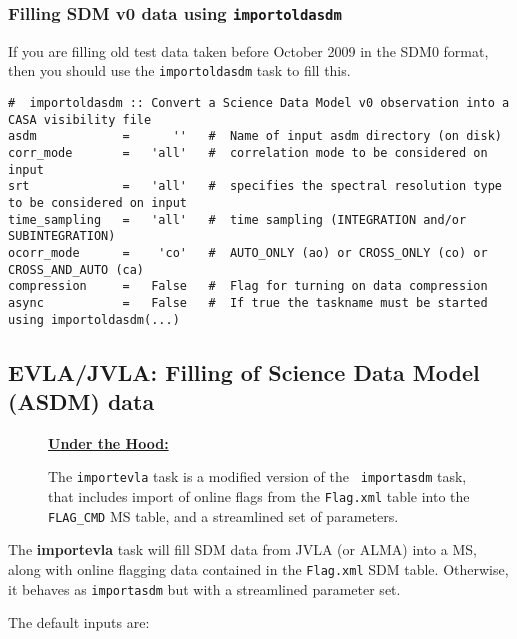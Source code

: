 \subsubsection{Filling SDM v0 data using {\tt importoldasdm}}
\label{section:io.import.asdm.old}

If you are filling old test data taken
before October 2009 in the SDM0 format, then you should use the 
{\tt importoldasdm} task to fill this.
\small
\begin{verbatim}
#  importoldasdm :: Convert a Science Data Model v0 observation into a CASA visibility file
asdm            =      ''   #  Name of input asdm directory (on disk)
corr_mode       =   'all'   #  correlation mode to be considered on input
srt             =   'all'   #  specifies the spectral resolution type to be considered on input
time_sampling   =   'all'   #  time sampling (INTEGRATION and/or SUBINTEGRATION)
ocorr_mode      =    'co'   #  AUTO_ONLY (ao) or CROSS_ONLY (co) or CROSS_AND_AUTO (ca)
compression     =   False   #  Flag for turning on data compression
async           =   False   #  If true the taskname must be started using importoldasdm(...)
\end{verbatim}
\normalsize

\subsection{EVLA/JVLA: Filling of Science Data Model (ASDM) data}
\label{section:io.import.evla}

\begin{wrapfigure}{r}{2.5in}
  \begin{boxedminipage}{2.5in}
     \centerline{\underline{\bf Under the Hood:}}
     The {\tt importevla} task is a modified version of the {\tt
     importasdm} task, that includes import of online flags from 
     the {\tt Flag.xml} table into the {\tt FLAG\_CMD} MS table,
     and a streamlined set of parameters.
  \end{boxedminipage}
\end{wrapfigure}

The {\bf importevla} task will fill SDM data from JVLA (or ALMA) into
a MS, along with online flagging data contained in the {\tt Flag.xml}
SDM table.  Otherwise, it behaves as {\tt importasdm} but with a
streamlined parameter set.

The default inputs are:

